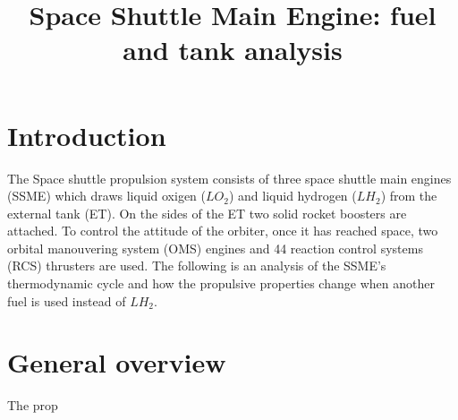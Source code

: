 
\title{Space Shuttle Main Engine: fuel and tank analysis}

    \maketitle
    \tableofcontents
    \newpage
    \section{Introduction}
    The Space shuttle propulsion system consists of three space shuttle main engines (SSME) which draws liquid oxigen ($ LO_2 $) and liquid hydrogen ($ LH_2 $) from the external tank (ET).
    On the sides of the ET two solid rocket boosters are attached.
    To control the attitude of the orbiter, once it has reached space, two orbital manouvering system (OMS) engines and 44 reaction control systems (RCS) thrusters are used.
    The following is an analysis of the SSME's thermodynamic cycle and how the propulsive properties change when another fuel is used instead of $ LH_2 $. 
    \section{General overview}
    The prop


